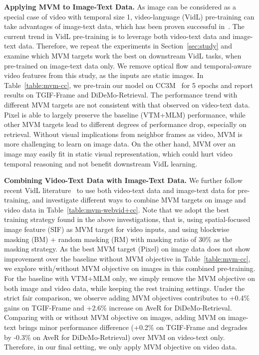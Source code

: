 \documentclass[10pt,twocolumn,letterpaper]{article}
\begin{document}
\vspace{0.5ex}
\noindent \textbf{Applying MVM to Image-Text Data.}
As image can be considered as a special case of video with temporal size 1, video-language (VidL) pre-training can take advantages of image-text data, which has been proven successful in~\cite{lei2021clip-bert, bain2021frozen}. The current trend in VidL pre-training is to leverage both video-text data and image-text data. Therefore, we repeat the experiments in Section~\ref{sec:study} and examine which MVM targets work the best on downstream VidL tasks, when pre-trained on image-text data only. We remove optical flow and temporal-aware video features from this study, as the inputs are static images. In Table~\ref{table:mvm-cc}, we pre-train our model on CC3M~\cite{sharma2018cc} for 5 epochs and report results on TGIF-Frame and DiDeMo-Retrieval. The performance trend with different MVM targets are not consistent with that observed on video-text data. Pixel is able to largely preserve the baseline (VTM+MLM) performance, while other MVM targets lead to different degrees of performance drop, especially on retrieval. Without visual implications from neighbor frames as video, MVM is more challenging to learn on image data. On the other hand, MVM over an image may easily fit in static visual representation, which could hurt video temporal reasoning and not benefit downstream VidL learning.

\vspace{0.5ex}
\noindent \textbf{Combining Video-Text Data with Image-Text Data.}
We further follow recent VidL literature~\cite{bain2021frozen,li2022alpro} to use both video-text data and image-text data for pre-training, and investigate different ways to combine MVM targets on image and video data in Table~\ref{table:mvm-webvid+cc}. Note that we adopt the best training strategy found in the above investigations, that is, using spatial-focused image feature (SIF) as MVM target for video inputs, and using blockwise masking (BM) + random masking (RM) with masking ratio of 30\% as the masking strategy. As the best MVM target (Pixel) on image data does not show improvement over the baseline without MVM objective in Table~\ref{table:mvm-cc}, we explore with/without MVM objective on images in this combined pre-training. For the baseline with VTM+MLM only, we simply remove the MVM objective on both image and video data, while keeping the rest training settings. Under the strict fair comparison, we observe adding MVM objectives contributes to +0.4\% gains on TGIF-Frame and +2.6\% increase on AveR for DiDeMo-Retrieval.  
Comparing with or without MVM objective on images, adding MVM on image-text brings minor performance difference (+0.2\%  on TGIF-Frame and degrades by -0.3\%  on AveR for DiDeMo-Retrieval) over MVM on video-text only. 
Therefore, in our final setting, we only apply MVM objective on video data. 
\end{document}

